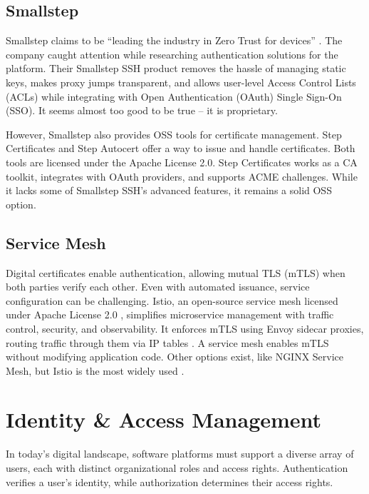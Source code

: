 \subsection{Smallstep}
Smallstep claims to be ``leading the industry in Zero Trust for devices'' \parencite{smallstep}. The company caught attention while researching authentication solutions for the platform. Their Smallstep SSH product removes the hassle of managing static keys, makes proxy jumps transparent, and allows user-level Access Control Lists (ACLs) while integrating with Open Authentication (OAuth) Single Sign-On (SSO). It seems almost too good to be true -- it is proprietary.

However, Smallstep also provides OSS tools for certificate management. Step Certificates \cite{smallstep_certificates} and Step Autocert \cite{smallstep_autocert} offer a way to issue and handle certificates. Both tools are licensed under the Apache License 2.0. Step Certificates works as a CA toolkit, integrates with OAuth providers, and supports ACME challenges. While it lacks some of Smallstep SSH's advanced features, it remains a solid OSS option.

\subsection{Service Mesh}
Digital certificates enable authentication, allowing mutual TLS (mTLS) when both parties verify each other. Even with automated issuance, service configuration can be challenging. Istio, an open-source service mesh licensed under Apache License 2.0 \cite{istio_license}, simplifies microservice management with traffic control, security, and observability. It enforces mTLS using Envoy sidecar proxies, routing traffic through them via IP tables \cite{istio_architecture}. A service mesh enables mTLS without modifying application code. Other options exist, like NGINX Service Mesh, but Istio is the most widely used \cite{toptal_service_mesh}.

\section{Identity \& Access Management}\label{chap:IAM}
In today's digital landscape, software platforms must support a diverse array of users, each with distinct organizational roles and access rights. Authentication verifies a user's identity, while authorization determines their access rights.


